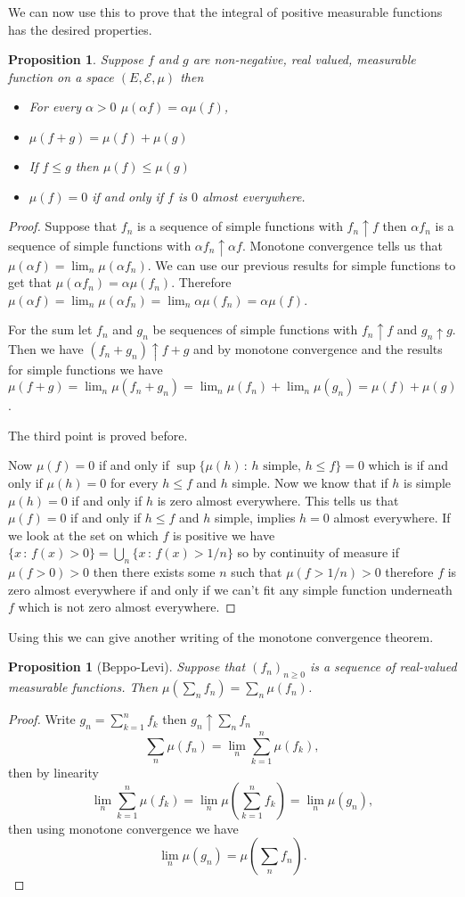 \documentclass[11pt]{article}
\newtheorem{prp}[thm]{Proposition}
\theoremstyle{definition}
\theoremstyle{remark}
\begin{document}
We can now use this to prove that the integral of positive measurable functions has the desired properties. 
\begin{prp}
Suppose $f$ and $g$ are non-negative, real valued, measurable function on a space $(E, \mathcal{E}, \mu)$ then 
\begin{itemize}
\item For every $\alpha>0$ $\mu(\alpha f) = \alpha \mu(f)$,
\item $\mu(f+g) = \mu(f) + \mu(g)$
\item If $f \leq g$ then $\mu(f) \leq \mu(g)$
\item $\mu(f) = 0$ if and only if $f$ is $0$ almost everywhere.
\end{itemize}
\end{prp}
\begin{proof}
Suppose that $f_n$ is a sequence of simple functions with $f_n \uparrow f$ then $\alpha f_n$ is a sequence of simple functions with $\alpha f_n \uparrow \alpha f$. Monotone convergence tells us that $\mu(\alpha f) = \lim_n \mu(\alpha f_n)$. We can use our previous results for simple functions to get that $\mu(\alpha f_n) = \alpha \mu(f_n)$. Therefore $\mu(\alpha f) = \lim_n \mu(\alpha f_n) = \lim_n \alpha \mu(f_n) = \alpha \mu(f)$.

For the sum let $f_n$ and $g_n$ be sequences of simple functions with $f_n \uparrow f$ and $g_n \uparrow g$. Then we have $(f_n + g_n) \uparrow f+g$ and by monotone convergence and the results for simple functions we have $\mu(f+g) = \lim_n \mu(f_n + g_n) = \lim_n \mu(f_n) + \lim_n \mu(g_n) = \mu(f) + \mu(g)$.

The third point is proved before.

Now $\mu(f) = 0$ if and only if $\sup\{ \mu(h) \,:\, \mbox{$h$ simple},\, h \leq f\} = 0$ which is if and only if $\mu(h) = 0$ for every $h \leq f$ and $h$ simple. Now we know that if $h$ is simple $\mu(h) = 0$ if and only if $h$ is zero almost everywhere. This tells us that $\mu(f) = 0$ if and only if $h \leq f$ and $h$ simple, implies $h = 0$ almost everywhere. If we look at the set on which $f$ is positive we have $\{x\,:\, f(x)>0\} = \bigcup_n \{ x \,:\, f(x) > 1/n\}$ so by continuity of measure if $\mu( f>0)>0$ then there exists some $n$ such that $\mu(f >1/n)>0$ therefore $f$ is zero almost everywhere if and only if we can't fit any simple function underneath $f$ which is not zero almost everywhere.
\end{proof}


Using this we can give another writing of the monotone convergence theorem.
\begin{prp}[Beppo-Levi]
Suppose that $(f_n)_{n \geq 0}$ is a sequence of real-valued measurable functions. Then $\mu(\sum_n f_n) = \sum_n \mu(f_n)$.
\end{prp}
\begin{proof}
Write $g_n = \sum_{k=1}^n f_k$ then $g_n \uparrow \sum_n f_n$
\[  \sum_n \mu(f_n) = \lim_n \sum_{k=1}^n \mu(f_k),\] then by linearity
\[ \lim_n \sum_{k=1}^n \mu(f_k) = \lim_n \mu(\sum_{k=1}^n f_k) = \lim_n \mu(g_n), \] then using monotone convergence we have
\[ \lim_n \mu(g_n) = \mu(\sum_n f_n). \]
\end{proof}
\end{document}
